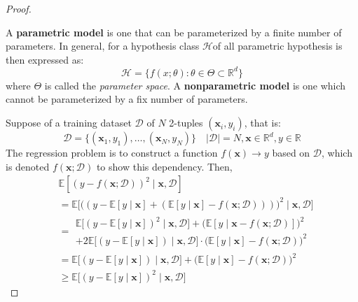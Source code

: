 \begin{proof}
    \begin{definition}[Parameterization]
        A \textbf{parametric model} is one that can be parameterized by a finite number of parameters. In general, for a hypothesis class $\mathcal{H}$of all parametric hypothesis is then expressed as:
        \begin{equation}
            \mathcal{H} = \{f(x;\theta): \theta \in \Theta \subset \mathbb{R}^{d}\}
        \end{equation} where $\Theta$ is called the \textit{parameter space}. A \textbf{nonparametric model} is one which cannot be parameterized by a fix number of parameters.   
    \end{definition}
    Suppose of a training dataset $\mathcal{D}$ of $N$ 2-tuples $(\mathbf{x}_{i},y_{i})$, that is: \begin{equation}
        \mathcal{D} = \{(\mathbf{x}_{1},y_{1}),\dots,(\mathbf{x}_{N},y_{N})\} \quad \lvert \mathcal{D} \rvert = N, \mathbf{x}\in \mathbb{R}^{d}, y \in \mathbb{R}
    \end{equation}
    The regression problem is to construct a function $f(\mathbf{x})\to y$ based on $\mathcal{D}$, which is denoted $f(\mathbf{x};\mathcal{D})$ to show this dependency. Then, 
    \begin{equation}
        \begin{split}
            &\mathbb{E}\left[ (y-f(\mathbf{x};\mathcal{D}))^{2}\mid \mathbf{x},\mathcal{D}\right]\\ & = \mathbb{E}\Big[\big( (y-\mathbb{E}[y\mid \mathbf{x}]+ (\mathbb{E}[y\mid \mathbf{x}]-f(\mathbf{x};\mathcal{D}))) \big)^{2}\mid \mathbf{x},\mathcal{D}\Big]\\
            & = \begin{multlined}
                \mathbb{E} \Big[ (y- \mathbb{E}[y\mid \mathbf{x}])^{2}\mid \mathbf{x},\mathcal{D} \Big] + \Big(\mathbb{E}[y\mid \mathbf{x}-f(\mathbf{x};\mathcal{D})]\Big)^{2} \\ + 2\mathbb{E} \big[(y-\mathbb{E}[y\mid \mathbf{x}])\mid \mathbf{x},\mathcal{D}\big]\cdot \big(\mathbb{E}[y\mid \mathbf{x}]-f(\mathbf{x;\mathcal{D}})\big)^{2} 
            \end{multlined} \\
            & = \mathbb{E} \Big[(y-\mathbb{E}[y\mid \mathbf{x}])\mid \mathbf{x},\mathcal{D}\Big] + \big(\mathbb{E}[y\mid \mathbf{x}]-f(\mathbf{x};\mathcal{D})\big)^{2}\\
            & \geq \mathbb{E} \big[(y-\mathbb{E}[y\mid \mathbf{x}])^{2}\mid \mathbf{x},\mathcal{D}\big]

\end{split}
\end{equation}
\end{proof}
